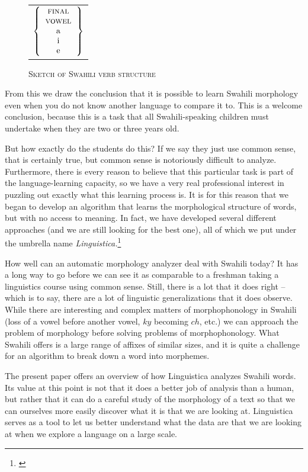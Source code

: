 \documentclass[output=paper,colorlinks,citecolor=brown]{langscibook}
\begin{document}
\begin{figure}
\begin{sideways}
\begin{tabular}{l}
$\left\{ \begin{tabular}{c} \textsc{final}\\ \textsc{vowel}\\a\\i\\e  \end{tabular}  \right\}$

\end{tabular}
\end{sideways}
\caption{\textsc{Sketch of Swahili verb structure}}
\label{sketch1}
\end{figure}
 
From this we draw the conclusion that it is possible to learn Swahili morphology even when you do not know another language to compare it to. This is a welcome conclusion, because this is a task that all Swahili-speaking children must undertake when they are two or three years old. 

But how exactly do the students do this? If we say they just use common sense, that is certainly true, but common sense is notoriously difficult to analyze. Furthermore, there is every reason to believe that this particular task is part of the language-learning capacity, so we have a very real professional interest in puzzling out exactly what this learning process is. It is for this reason that we began to develop an algorithm that learns the morphological structure of words, but with no access to meaning. In fact, we have developed several different approaches (and we are still looking for the best one), all of which we put under the umbrella name \textit{Linguistica.}\footnote{\citep{Goldsmith2001,Goldsmith2006,Goldsmith2010} }  

How well can an automatic morphology analyzer deal with Swahili today? It has a long way to go before we can see it as comparable to a freshman taking a linguistics course using common sense. Still, there is a lot that it does right -- which is to say, there are a lot of linguistic generalizations that it does observe. While there are interesting and complex matters of morphophonology in Swahili (loss of a vowel before another vowel, $ky$ becoming $ch$, etc.) we can approach the problem of morphology before solving problems of morphophonology. What Swahili offers is a large range of affixes of similar sizes, and it is quite a challenge for an algorithm to break down a word into morphemes.

The present paper offers an overview of how Linguistica analyzes Swahili words. Its value at this point is not that it does a better job of analysis than a human, but rather that it can do a careful study of the morphology of a text so that we can ourselves more easily discover what it is that we are looking at. Linguistica serves as a tool to let us better understand what the data are that we are looking at when we explore a language on a large scale.
\end{document}
